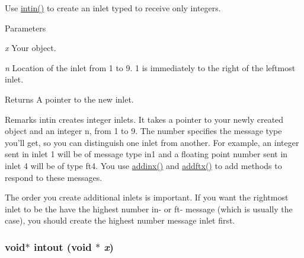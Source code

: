 Use \hyperlink{group__inout_ga8ca68c8eafef51622f263f13e047341b}{intin()} to create an inlet typed to receive only integers. 
\begin{DoxyParams}{Parameters}
\item[{\em x}]Your object. \item[{\em n}]Location of the inlet from 1 to 9. 1 is immediately to the right of the leftmost inlet. \end{DoxyParams}
\begin{DoxyReturn}{Returns}
A pointer to the new inlet.
\end{DoxyReturn}
\begin{DoxyRemark}{Remarks}
intin creates integer inlets. It takes a pointer to your newly created object and an integer n, from 1 to 9. The number specifies the message type you’ll get, so you can distinguish one inlet from another. For example, an integer sent in inlet 1 will be of message type in1 and a floating point number sent in inlet 4 will be of type ft4. You use \hyperlink{group__class__old_gad3a69b2d38b257464c6a0f8a50efd85a}{addinx()} and \hyperlink{group__class__old_gad223143c8da12d8f3b7b18f9d6e5da9e}{addftx()} to add methods to respond to these messages.
\end{DoxyRemark}
The order you create additional inlets is important. If you want the rightmost inlet to be the have the highest number in-\/ or ft-\/ message (which is usually the case), you should create the highest number message inlet first. \hypertarget{group__inout_ga9b8d897c728eeafa5638d4fc16ff704e}{
\subsubsection[{intout}]{\setlength{\rightskip}{0pt plus 5cm}void$\ast$ intout (void $\ast$ {\em x})}}
\label{group__inout_ga9b8d897c728eeafa5638d4fc16ff704e}


